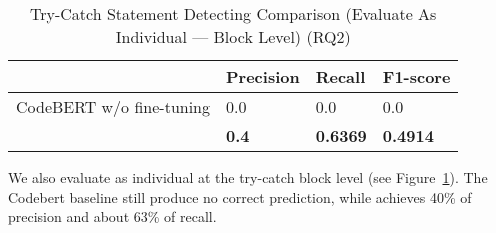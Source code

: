 \begin{table}[t]%
\caption{Try-Catch Statement Detecting Comparison (Evaluate {\xstate} As Individual --- Block Level) (RQ2)}
  \vspace{-12pt}
  \small
	\begin{center}
		\renewcommand{\arraystretch}{1}
		\begin{tabular}{| p{3.05cm}<{\centering} | p{1.2cm}<{\centering} | p{1.2cm}<{\centering}| p{1.2cm}<{\centering}|}
		  \hline
			  & Precision  & Recall & F1-score \\
			\hline
			CodeBERT w/o fine-tuning &  0.0 & 0.0  & 0.0\\
			\hline
			{\xstate}  & \textbf{0.4}  &  \textbf{0.6369} & \textbf{0.4914}\\
			\hline
		\end{tabular}
		\label{tab:xstate-block}
	\end{center}
\end{table}

We also evaluate {\xstate} as individual at the try-catch block level (see Figure~\ref{tab:xstate-block}). The Codebert baseline still produce no correct prediction, while {\xstate} achieves 40\% of precision and about 63\% of recall. 

